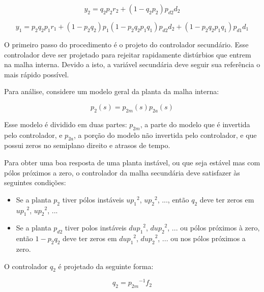     \begin{equation}
        y_2 = q_2 p_2 r_2 + \left( 1- q_2 p_2 \right) p_{d2} d_2
    \end{equation}

    \begin{equation}
        y_1 = p_2 q_2 p_1 r_1 + \left( 1 - p_2 q_2 \right) p_1 \left(
            1 - p_2 q_2 p_1 q_1 \right) p_{d2} d_2 + \left( 1 - p_2 q_2 p_1 q_1
            \right) p_{d1} d_1
    \end{equation}

    O primeiro passo do procedimento é o projeto do controlador secundário. Esse
    controlador deve ser projetado para rejeitar rapidamente distúrbios que entrem
    na malha interna. Devido a isto, a variável secundária deve seguir sua referência
    o mais rápido possível.

    Para análise, considere um modelo geral da planta da malha interna:

    \begin{equation}
        p_2(s) = p_{2m}(s) p_{2a}(s)
    \end{equation}

    Esse modelo é dividido em duas partes: $p_{2m}$, a parte do modelo que é invertida
    pelo controlador, e $p_{2a}$, a porção do modelo não invertida pelo controlador,
    e que possui zeros no semiplano direito e atrasos de tempo.

    Para obter uma boa resposta de uma planta instável, ou que seja estável mas com
    pólos próximos a zero, o controlador da malha secundária deve satisfazer às
    seguintes condições:

    \begin{itemize}
        \item Se a planta $p_2$ tiver pólos instáveis ${up_1}^2$, ${up_2}^2$, ...,
        então $q_2$ deve ter zeros em ${up_1}^2$, ${up_2}^2$, ...
        \item Se a planta $p_{d2}$ tiver polos instáveis ${dup_1}^2$, ${dup_2}^2$,
        ... ou pólos próximos à zero, então $1 - p_2 q_2$ deve ter zeros em
        ${dup_1}^2$, ${dup_2}^2$, ... ou nos pólos próximos a zero.
    \end{itemize}

    O controlador $q_2$ é projetado da seguinte forma:

    \begin{equation}
        q_2 = {p_{2m}}^{-1} f_2
    \end{equation}

